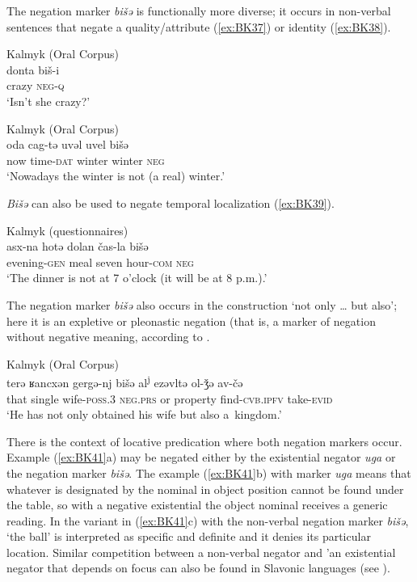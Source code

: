 \documentclass[output=paper]{langsci/langscibook}
\begin{document}
The negation marker \textit{bišǝ} is functionally more diverse; it occurs in non-verbal sentences that negate a quality/attribute (\ref{ex:BK37}) or identity (\ref{ex:BK38}).

\ea Kalmyk (Oral Corpus) \label{ex:BK37}\\
	\gll donta		biš-i\\
	crazy		\textsc{neg-q}\\
	\glt `Isn’t she crazy?'
\z

\ea Kalmyk (Oral Corpus) \label{ex:BK38}\\
	\gll oda	cag-tə		uvəl		uvel		bišǝ\\
	now	time-\textsc{dat}	winter	winter	\textsc{neg}\\
	\glt `Nowadays the winter is not (a real) winter.'
\z


\textit{Bišǝ} can also be used to negate temporal localization (\ref{ex:BK39}).

\ea Kalmyk (questionnaires) \label{ex:BK39}\\
	\gll asx-na			hotə	dolan		čas-la		bišǝ\\
	evening-\textsc{gen}	meal	seven		hour-\textsc{com}	\textsc{neg}\\
	\glt `The dinner is not at 7 o’clock (it will be at 8 p.m.).'
\z


The negation marker \textit{bišǝ} also occurs in the construction ‘not only … but also’; here it is an expletive or pleonastic negation (that is, a marker of negation without negative meaning, according to \citep[126]{Horn2010}.

\ea Kalmyk (Oral Corpus) \label{ex:BK40}\\
	\gll terǝ	ʁancxǝn		gergǝ-nj		bišǝ			al\textsuperscript{j}		ezǝvltǝ	ol-ǯǝ				av-čǝ\\
	that	single		wife-\textsc{poss.3}		\textsc{neg.prs}		or		property	find-\textsc{cvb.ipfv}	take-\textsc{evid}\\
	\glt `He has not only obtained his wife but also a kingdom.'
\z


There is the context of locative predication where both negation markers occur. Example (\ref{ex:BK41}a) may be negated either by the existential negator \textit{uga} or the negation marker \textit{bišǝ}. The example (\ref{ex:BK41}b) with marker \textit{uga} means that whatever is designated by the nominal in object position cannot be found under the table, so with a negative existential the object nominal receives a generic reading. In the variant in (\ref{ex:BK41}c) with the non-verbal negation marker \textit{bišǝ}, ‘the ball’ is interpreted as specific and definite and it denies its particular location. Similar competition between a non-verbal negator and 'an existential negator that depends on focus can also be found in Slavonic languages (see \citealp[197]{Veselinova2010}).
\end{document}
